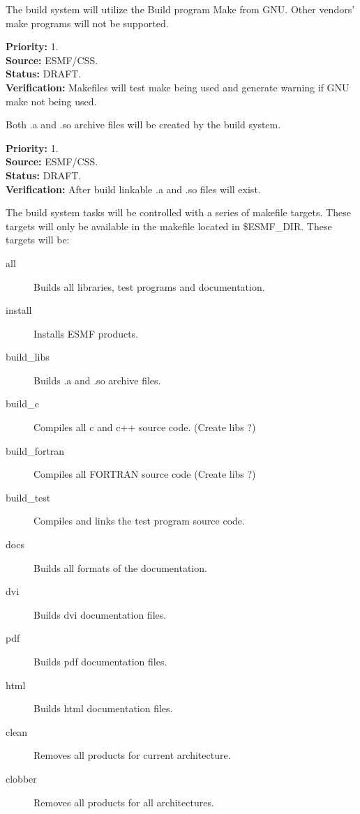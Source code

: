 

The build system will utilize the Build program Make from
GNU.  Other vendors' make programs will not be supported.
\begin{reqlist}
{\bf Priority:} 1. \\
{\bf Source:} ESMF/CSS. \\
{\bf Status:} DRAFT. \\
{\bf Verification:} Makefiles will test make being used and generate
warning if GNU make not being used.
\end{reqlist}

Both .a and .so archive files will be created by the 
build system.
\begin{reqlist}
{\bf Priority:} 1. \\
{\bf Source:} ESMF/CSS. \\
{\bf Status:} DRAFT. \\
{\bf Verification:} After build linkable .a and .so files will exist.
\end{reqlist}

The build system tasks will be controlled with a series of
makefile targets.  These targets will only be available 
in the makefile located in \$ESMF\_DIR.  These targets will be:
\begin{description}
\item[all] Builds all libraries, test programs and documentation.
\item[install] Installs ESMF products.
\item[build\_libs] Builds .a and .so archive files.
\item[build\_c] Compiles all c and c++ source code.  (Create libs ?)
\item[build\_fortran] Compiles all FORTRAN source code (Create libs ?)
\item[build\_test] Compiles and links the test program source code.
\item[docs] Builds all formats of the documentation.
\item[dvi] Builds dvi documentation files.
\item[pdf] Builds pdf documentation files.
\item[html] Builds html documentation files.
\item[clean] Removes all products for current architecture.
\item[clobber] Removes all products for all architectures.
\end{description}

